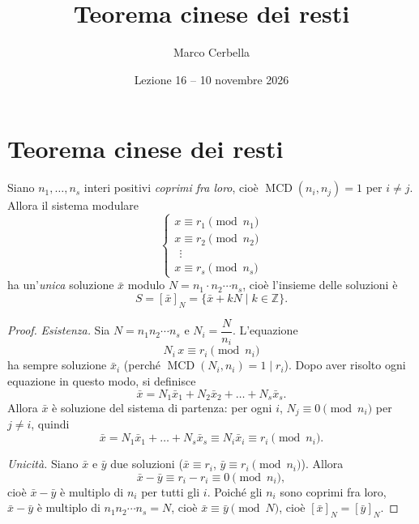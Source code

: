 \documentclass[11pt,a4paper]{article}
\title{Teorema cinese dei resti}
\author{Marco Cerbella}
\date{Lezione 16 -- 10 novembre 2026}
\begin{document}
\maketitle

\section{Teorema cinese dei resti}

\begin{teorema}
Siano $n_1, \dots, n_s$ interi positivi \emph{coprimi fra loro}, cioè $\operatorname{MCD}(n_i, n_j) = 1$ per $i \neq j$. Allora il sistema modulare
\[
  \begin{cases}
    x \equiv r_1 \pmod{n_1} \\
    x \equiv r_2 \pmod{n_2} \\
    \ \ \vdots \\
    x \equiv r_s \pmod{n_s}
  \end{cases}
\]
ha un'\emph{unica} soluzione $\bar{x}$ modulo $N = n_1\cdot n_2\cdots n_s$, cioè l'insieme delle soluzioni è
\[
  S = [\bar{x}]_N = \{\bar{x} + kN \mid k \in \mathbb{Z}\}.
\]
\end{teorema}

\begin{proof}
\emph{Esistenza.} Sia $N = n_1 n_2 \cdots n_s$ e $N_i = \dfrac{N}{n_i}$. L'equazione
\[
  N_i\, x \equiv r_i \pmod{n_i}
\]
ha sempre soluzione $\bar{x}_i$ (perché $\operatorname{MCD}(N_i, n_i) = 1 \mid r_i$). Dopo aver risolto ogni equazione in questo modo, si definisce
\[
  \bar{x} = N_1\bar{x}_1 + N_2\bar{x}_2 + \dots + N_s\bar{x}_s .
\]
Allora $\bar{x}$ è soluzione del sistema di partenza: per ogni $i$, $N_j \equiv 0 \pmod{n_i}$ per $j \neq i$, quindi
\[
  \bar{x} = N_1\bar{x}_1 + \dots + N_s\bar{x}_s \equiv N_i\bar{x}_i \equiv r_i \pmod{n_i}.
\]

\emph{Unicità.} Siano $\bar{x}$ e $\bar{y}$ due soluzioni ($\bar{x} \equiv r_i$, $\bar{y} \equiv r_i \pmod{n_i}$). Allora
\[
  \bar{x} - \bar{y} \equiv r_i - r_i \equiv 0 \pmod{n_i},
\]
cioè $\bar{x} - \bar{y}$ è multiplo di $n_i$ per tutti gli $i$. Poiché gli $n_i$ sono coprimi fra loro, $\bar{x} - \bar{y}$ è multiplo di $n_1 n_2 \cdots n_s = N$, cioè $\bar{x} \equiv \bar{y} \pmod N$, cioè $[\bar{x}]_N = [\bar{y}]_N$.
\end{proof}
\end{document}

